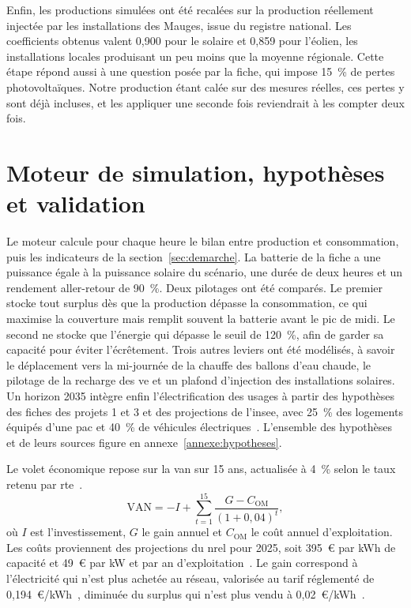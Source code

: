 Enfin, les productions simulées ont été recalées sur la production réellement injectée par les installations des Mauges, issue du registre national. Les coefficients obtenus valent 0,900 pour le solaire et 0,859 pour l'éolien, les installations locales produisant un peu moins que la moyenne régionale. Cette étape répond aussi à une question posée par la fiche, qui impose 15~\% de pertes photovoltaïques. Notre production étant calée sur des mesures réelles, ces pertes y sont déjà incluses, et les appliquer une seconde fois reviendrait à les compter deux fois.

\section{Moteur de simulation, hypothèses et validation}
\label{sec:moteur}

Le moteur calcule pour chaque heure le bilan entre production et consommation, puis les indicateurs de la section~\ref{sec:demarche}. La batterie de la fiche a une puissance égale à la puissance solaire du scénario, une durée de deux heures et un rendement aller-retour de 90~\%. Deux pilotages ont été comparés. Le premier stocke tout surplus dès que la production dépasse la consommation, ce qui maximise la couverture mais remplit souvent la batterie avant le pic de midi. Le second ne stocke que l'énergie qui dépasse le seuil de 120~\%, afin de garder sa capacité pour éviter l'écrêtement. Trois autres leviers ont été modélisés, à savoir le déplacement vers la mi-journée de la chauffe des ballons d'eau chaude, le pilotage de la recharge des \gls{ve} et un plafond d'injection des installations solaires. Un horizon 2035 intègre enfin l'électrification des usages à partir des hypothèses des fiches des projets 1 et 3 et des projections de l'\gls{insee}, avec 25~\% des logements équipés d'une \gls{pac} et 40~\% de véhicules électriques~\cite{fiche_projets, insee_omphale, rte_bp2025}. L'ensemble des hypothèses et de leurs sources figure en annexe~\ref{annexe:hypotheses}.

Le volet économique repose sur la \gls{van} sur 15 ans, actualisée à 4~\% selon le taux retenu par \gls{rte}~\cite{rte_fe2050}.
\begin{equation}
\mathrm{VAN} = -I + \sum_{t=1}^{15} \frac{G - C_{\mathrm{OM}}}{(1+0{,}04)^{t}},
\label{eq:van}
\end{equation}
où $I$ est l'investissement, $G$ le gain annuel et $C_{\mathrm{OM}}$ le coût annuel d'exploitation. Les coûts proviennent des projections du \gls{nrel} pour 2025, soit 395~€ par kWh de capacité et 49~€ par kW et par an d'exploitation~\cite{nrel2025, bce}. Le gain correspond à l'électricité qui n'est plus achetée au réseau, valorisée au tarif réglementé de 0,194~€/kWh~\cite{cre_trve}, diminuée du surplus qui n'est plus vendu à 0,02~€/kWh~\cite{cre_surplus}.

